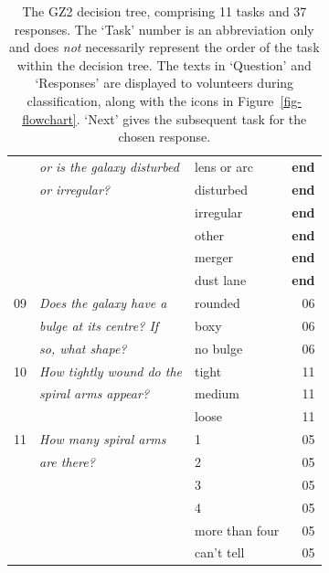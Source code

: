 \documentclass[useAMS,usenatbib]{mn2e}
\begin{document}
\begin{table}
\begin{tabular}{@{}cllr}
      & {\it or is the galaxy disturbed    }  & lens or arc      & {\bf end}        \\
      & {\it or irregular?                 }  & disturbed        & {\bf end}        \\
      & {\it                               }  & irregular        & {\bf end}        \\  
      & {\it                               }  & other            & {\bf end}        \\  
      & {\it                               }  & merger           & {\bf end}        \\  
      & {\it                               }  & dust lane        & {\bf end}        \\  
      \hline
09    & {\it Does the galaxy have a        }  & rounded          & 06 \\
      & {\it bulge at its centre? If       }  & boxy             & 06 \\
      & {\it so, what shape?               }  & no bulge         & 06 \\
      \hline
10    & {\it How tightly wound do the      }  & tight            & 11 \\
      & {\it spiral arms appear?           }  & medium           & 11 \\
      & {\it                               }  & loose            & 11 \\    
      \hline
11    & {\it How many spiral arms          }  & 1                & 05 \\
      & {\it  are there?                   }  & 2                & 05 \\
      & {\it                               }  & 3                & 05 \\
      & {\it                               }  & 4                & 05 \\
      & {\it                               }  & more than four   & 05 \\
      & {\it                               }  & can't tell       & 05 \\
\hline
 \end{tabular}
 \caption{The GZ2 decision tree, comprising 11 tasks and 37 responses. The `Task' number is an abbreviation only and does {\em not} necessarily represent the order of the task within the decision tree. The texts in `Question' and `Responses' are displayed to volunteers during classification, along with the icons in Figure~\ref{fig-flowchart}. `Next' gives the subsequent task for the chosen response. \label{tbl-tree}}
\end{table}
\end{document}
